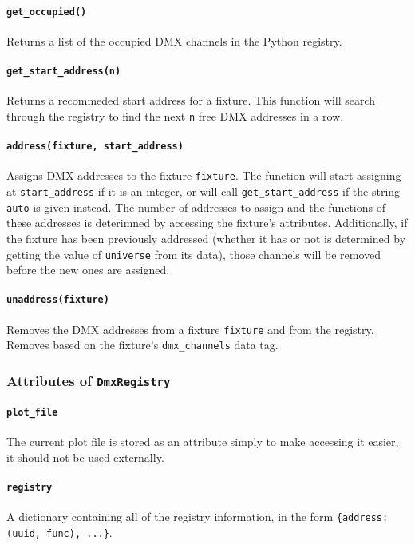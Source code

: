 \documentclass[a4paper]{article}
\begin{document}
\paragraph{\texttt{get\_occupied()}}
Returns a list of the occupied DMX channels in the Python registry.

\paragraph{\texttt{get\_start\_address(n)}}
Returns a recommeded start address for a fixture. This function will search 
through the registry to find the next \texttt{n} free DMX addresses in a row.

\paragraph{\texttt{address(fixture, start\_address)}}
Assigns DMX addresses to the fixture \texttt{fixture}. The function will start 
assigning at \texttt{start\_address} if it is an integer, or will call 
\texttt{get\_start\_address} if the string \texttt{auto} is given instead. 
The number of addresses to assign and the functions of these addresses is 
deterimned by accessing the fixture's attributes. Additionally, if the 
fixture has been previously addressed (whether it has or not is determined by 
getting the value of \texttt{universe} from its data), those channels will be 
removed before the new ones are assigned.

\paragraph{\texttt{unaddress(fixture)}}
Removes the DMX addresses from a fixture \texttt{fixture} and from the 
registry. Removes based on the fixture's \texttt{dmx\_channels} data tag.

\subsubsection{Attributes of \texttt{DmxRegistry}}

\paragraph{\texttt{plot\_file}}
The current plot file is stored as an attribute simply to make accessing it 
easier, it should not be used externally.

\paragraph{\texttt{registry}}
A dictionary containing all of the registry information, in the form 
\texttt{\{address: (uuid, func), ...\}}.
\end{document}
